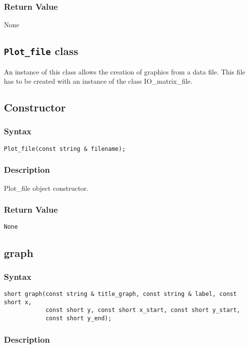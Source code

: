 \documentclass[11pt,fleqn,letterpaper]{report}
\begin{document}
\subsubsection*{Return Value}

None

\newpage

\subsection*{\texttt{Plot\_file} class}
An instance of this class allows the creation of graphics from a data
file. This file has to be created with an instance of the class IO\_matrix\_file. 
\subsection*{Constructor}
\subsubsection*{Syntax}
\begin{verbatim}
Plot_file(const string & filename);
\end{verbatim}

\subsubsection*{Description}   
Plot\_file object constructor.

\subsubsection*{Return Value}

{\tt None}
 \newpage 

\subsection*{graph}
\subsubsection*{Syntax}
\begin{verbatim}
short graph(const string & title_graph, const string & label, const short x,
            const short y, const short x_start, const short y_start,
            const short y_end);
\end{verbatim}

\subsubsection*{Description}   
\end{document}
